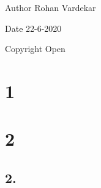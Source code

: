\begin{DoxyAuthor}{Author}
Rohan Vardekar 
\end{DoxyAuthor}
\begin{DoxyDate}{Date}
22-\/6-\/2020 
\end{DoxyDate}
\begin{DoxyCopyright}{Copyright}
Open
\end{DoxyCopyright}
\hypertarget{index_Section}{}\section{1}\label{index_Section}
\hypertarget{index_Sectio}{}\section{2}\label{index_Sectio}
\hypertarget{index_SubSection}{}\subsection{2.}\label{index_SubSection}
